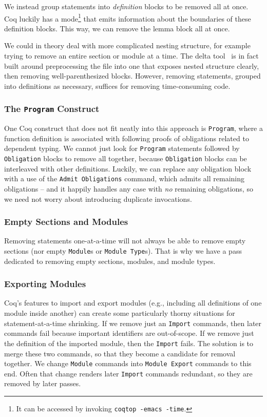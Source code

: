 \documentclass[a4paper,USenglish,cleveref,autoref,thm-restate,pdfa]{lipics-v2021}
\begin{document}
We instead group statements into \emph{definition} blocks to be removed all at once.
Coq luckily has a mode\footnote{It can be accessed by invoking \texttt{coqtop -emacs -time}.} that emits information about the boundaries of these definition blocks.
This way, we can remove the lemma block all at once.

We could in theory deal with more complicated nesting structure, for example trying to remove an entire section or module at a time.
The delta tool~\cite{delta} is in fact built around preprocessing the file into one that exposes nested structure clearly, then removing well-parenthesized blocks.
However, removing statements, grouped into definitions as necessary, suffices for removing time-consuming code.

\subsubsection{The \texttt{Program} Construct}
One Coq construct that does not fit neatly into this approach is \verb|Program|, where a function definition is associated with following proofs of obligations related to dependent typing.
We cannot just look for \verb|Program| statements followed by \verb|Obligation| blocks to remove all together, because \verb|Obligation| blocks can be interleaved with other definitions.
Luckily, we can replace any obligation block with a use of the \verb|Admit Obligations| command, which admits all remaining obligations -- and it happily handles any case with \emph{no} remaining obligations, so we need not worry about introducing duplicate invocations.

\subsubsection{Empty Sections and Modules}
Removing statements one-at-a-time will not always be able to remove empty sections (nor empty \verb|Module|s or \verb|Module Type|s).
That is why we have a pass dedicated to removing empty sections, modules, and module types.

\subsubsection{Exporting Modules}
Coq's features to import and export modules (e.g., including all definitions of one module inside another) can create some particularly thorny situations for statement-at-a-time shrinking.
If we remove just an \verb|Import| commands, then later commands fail because important identifiers are out-of-scope.
If we remove just the definition of the imported module, then the \verb|Import| fails.
The solution is to merge these two commands, so that they become a candidate for removal together.
We change \verb|Module| commands into \verb|Module Export| commands to this end.
Often that change renders later \verb|Import| commands redundant, so they are removed by later passes.
\end{document}
